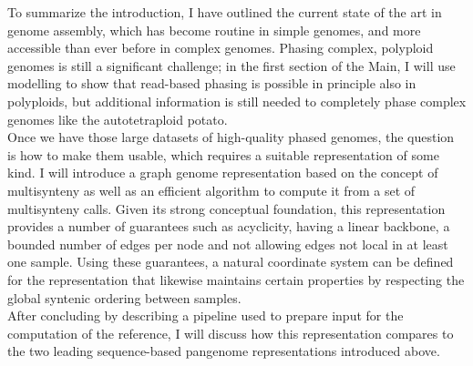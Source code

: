 To summarize the introduction, I have outlined the current state of the art in genome assembly, which has become routine in simple genomes, and more accessible than ever before in complex genomes.
Phasing complex, polyploid genomes is still a significant challenge;
in the first section of the Main, I will use modelling to show that read-based phasing is possible in principle also in polyploids, but additional information is still needed to completely phase complex genomes like the autotetraploid potato.\\
Once we have those large datasets of high-quality phased genomes, the question is how to make them usable, which requires a suitable representation of some kind.
I will introduce a graph genome representation based on the concept of multisynteny as well as an efficient algorithm to compute it from a set of multisynteny calls.
Given its strong conceptual foundation, this representation provides a number of guarantees such as acyclicity, having a linear backbone, a bounded number of edges per node and not allowing edges not local in at least one sample.
Using these guarantees, a natural coordinate system can be defined for the representation that likewise maintains certain properties by respecting the global syntenic ordering between samples.\\
After concluding by describing a pipeline used to prepare input for the computation of the reference, I will discuss how this representation compares to the two leading sequence-based pangenome representations introduced above.
